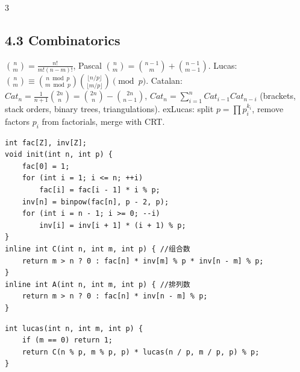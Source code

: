 \documentclass[8pt]{extarticle}
\begin{document}
\begin{multicols*}{3}
\subsection*{4.3 Combinatorics}

$\binom{n}{m} = \frac{n!}{m!(n-m)!}$, Pascal $\binom{n}{m} = \binom{n-1}{m} + \binom{n-1}{m-1}$. Lucas: $\binom{n}{m} \equiv \binom{n \bmod p}{m \bmod p}\binom{\lfloor n/p \rfloor}{\lfloor m/p \rfloor} \pmod p$. Catalan: $Cat_n = \frac{1}{n+1}\binom{2n}{n} = \binom{2n}{n} - \binom{2n}{n-1}$, $Cat_n = \sum_{i=1}^{n} Cat_{i-1}Cat_{n-i}$ (brackets, stack orders, binary trees, triangulations). exLucas: split $p = \prod p_i^{k_i}$, remove factors $p_i$ from factorials, merge with CRT.


\begin{lstlisting}
int fac[Z], inv[Z];
void init(int n, int p) {
    fac[0] = 1;
    for (int i = 1; i <= n; ++i)
        fac[i] = fac[i - 1] * i % p;
    inv[n] = binpow(fac[n], p - 2, p);
    for (int i = n - 1; i >= 0; --i)
        inv[i] = inv[i + 1] * (i + 1) % p;
}
inline int C(int n, int m, int p) { //组合数
    return m > n ? 0 : fac[n] * inv[m] % p * inv[n - m] % p;
}
inline int A(int n, int m, int p) { //排列数
    return m > n ? 0 : fac[n] * inv[n - m] % p;
}
\end{lstlisting}

\begin{lstlisting}
int lucas(int n, int m, int p) {
    if (m == 0) return 1;
    return C(n % p, m % p, p) * lucas(n / p, m / p, p) % p;
}
\end{lstlisting}


\end{multicols*}
\end{document}
